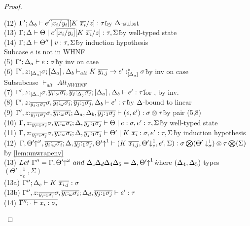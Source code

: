 \documentclass[acmsmall,review,anonymous,screen]{acmart}
\begin{document}
\begin{proof}
\begin{description}
\begin{tabbing}
    (12) $\Gamma'; \Delta_b \vdash e'\overline{[x_i/y_i]}[K~\overline{x_i}/z] : \tau$\` by $\Delta$-subst\\
    (13) $\Gamma; \Delta \vdash \Theta \mid e'\overline{[x_i/y_i]}[K~\overline{x_i}/z] : \tau, \Sigma$\` by well-typed state\\
    (14) $\Gamma; \Delta \vdash \Theta'' \mid v : \tau, \Sigma$\`by induction hypothesis\\
    Subcase $e$ is not in WHNF\\
    (5) $\Gamma'; \Delta_a \vdash e : \sigma$\` by inv on case\\
    (6) $\Gamma', z{:}_{\left[\Delta_a\right]}\sigma; \left[\Delta_a\right], \Delta_b \vdash_{alt} K~\overline{y_{i,j}} \to e' :^z_{\left[\Delta_a\right]} \sigma $\` by inv on case\\
    Subsubcase $\vdash_{alt}$ $Alt_{NWHNF}$\\
    (7) $\Gamma', z{:}_{\left[\Delta_a\right]}\sigma, \overline{y_i{:}_\omega\sigma_i}, \overline{y_j{:}_{\Delta_j}\sigma_j}; \left[\Delta_a\right], \Delta_b \vdash e' : \tau$\` for , by inv.\\
    (8) $\Gamma', z{:}_{\overline{y_j{:}_1\sigma_j}}\sigma, \overline{y_i{:}_\omega\sigma_i}; \overline{y_j{:}_1\sigma_j}, \Delta_b \vdash e' : \tau$\` by $\Delta$-bound to linear\\
    (9) $\Gamma', z{:}_{\overline{y_j{:}_1\sigma_j}}\sigma, \overline{y_i{:}_\omega\sigma_i}; \Delta_a, \Delta_b, \overline{y_j{:}_1\sigma_j} \vdash (e, e') : \sigma \otimes \tau$\` by pair (5,8)\\
    (10) $\Gamma, z{:}_{\overline{y_j{:}_1\sigma_j}}\sigma, \overline{y_i{:}_\omega\sigma_i}; \Delta, \overline{y_j{:}_1\sigma_j} \vdash \Theta \mid e : \sigma, e':\tau, \Sigma$\`by well-typed state\\
    (11) $\Gamma, z{:}_{\overline{y_j{:}_1\sigma_j}}\sigma, \overline{y_i{:}_\omega\sigma_i}; \Delta, \overline{y_j{:}_1\sigma_j} \vdash \Theta' \mid K~\overline{x_i} : \sigma, e':\tau, \Sigma$\`by induction hypothesis\\
    (12) $\Gamma, \Theta'{\uparrow}^\omega, \overline{y_i{:}_\omega\sigma_i}; \Delta, \overline{y_j{:}_1\sigma_j}, \Theta'{\uparrow}^1 \vdash (K~\overline{x_{i,j}}, \Theta'{\downarrow}^1_e, e', \Sigma) : \sigma \bigotimes(\Theta'\downarrow^1_\sigma) \otimes \tau \bigotimes(\Sigma)$\`by \ref{lem:unwrapenv}\\
    (13) $Let~\Gamma''=\Gamma,\Theta'{\uparrow}^\omega~and~\Delta_c\Delta_d\Delta_4\Delta_5=\Delta,\Theta'{\uparrow}^1$\` where $(\Delta_4, \Delta_5)$ types $(\Theta'{\downarrow^1_e}, \Sigma)$\\
    (13a) $\Gamma''; \Delta_c \vdash K~\overline{x_{i,j}} : \sigma$\\
    (13b) $\Gamma'', z{:}_{\overline{y_j{:}_1\sigma_j}}\sigma, \overline{y_i{:}_\omega\sigma_i}; \Delta_d, \overline{y_j{:}_1\sigma_j} \vdash e' : \tau$\\
    (14) $\overline{\Gamma''; \cdot \vdash x_i : \sigma_i}$\\

\end{tabbing}
\end{description}
\end{proof}
\end{document}
